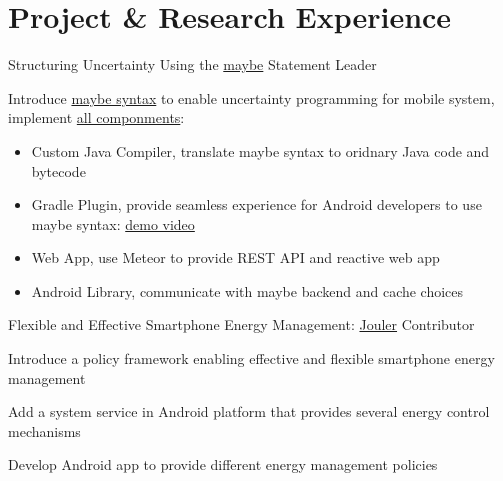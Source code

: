 
\section{Project \& Research Experience}



{Structuring Uncertainty Using the \href{http://blue.cse.buffalo.edu/projects/maybe}{maybe} Statement}
{Leader}
{}
{}
{
  \begin{tightitemize}
  \item Introduce \href{https://blue-systems-research-group.gitbooks.io/maybe/content/concepts.html}{maybe syntax} to enable uncertainty programming for mobile system,
implement \href{https://blue-systems-research-group.gitbooks.io/maybe/content/}{all componments}:
    \begin{itemize}
      \item Custom Java Compiler, translate maybe syntax to oridnary Java code and bytecode
      \item Gradle Plugin, provide seamless experience for Android developers to use maybe syntax: \href{https://www.youtube.com/watch?v=RYcQ7WVunmc}{demo video}
      \item Web App, use Meteor to provide REST API and reactive web app
      \item Android Library, communicate with maybe backend and cache choices
    \end{itemize}
  \end{tightitemize}
}

{Flexible and Effective Smartphone Energy Management: \href{http://blue.cse.buffalo.edu/projects/jouler/}{Jouler}}
{Contributor}
{}
{}
{
  \begin{tightitemize}
  \item Introduce a policy framework enabling effective and flexible smartphone energy management
  \item Add a system service in Android platform that provides several energy control mechanisms
  \item Develop Android app to provide different energy management policies
  \end{tightitemize}
}

